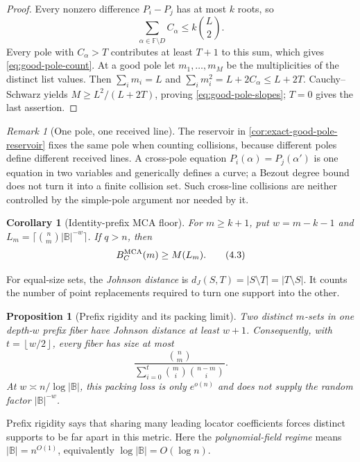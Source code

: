 \documentclass[11pt,a4paper]{amsart}
\numberwithin{equation}{section}
\newtheorem{proposition}[proposition]{Proposition}
\newtheorem{corollary}[corollary]{Corollary}
\theoremstyle{remark}
\newtheorem{remark}[remark]{Remark}
\newcommand{\F}{\mathbb F}
\newcommand{\B}{\mathbb B}
\newcommand{\abs}[1]{\lvert #1\rvert}
\newcommand{\floor}[1]{\left\lfloor #1\right\rfloor}
\begin{document}
\begin{proof}
Every nonzero difference \(P_i-P_j\) has at most \(k\) roots, so
\[
                 \sum_{\alpha\in\F\setminus D}C_\alpha
                    \le k\binom L2.
\]
Every pole with \(C_\alpha>T\) contributes at least \(T+1\) to this
sum, which gives \eqref{eq:good-pole-count}.  At a good
pole let \(m_1,\ldots,m_M\) be the multiplicities of the distinct list
values.  Then
\(\sum_im_i=L\) and
\(\sum_im_i^2=L+2C_\alpha\le L+2T\).  Cauchy--Schwarz yields
\(M\ge L^2/(L+2T)\), proving \eqref{eq:good-pole-slopes}; \(T=0\)
gives the last assertion.
\end{proof}

\begin{remark}[One pole, one received line]
The reservoir in \cref{cor:exact-good-pole-reservoir} fixes the same pole
when counting collisions, because different poles define different
received lines.  A cross-pole equation
\(P_i(\alpha)=P_j(\alpha')\) is one equation in two variables and
generically defines a curve; a Bezout degree bound does not turn it into a
finite collision set.  Such cross-line collisions are neither controlled
by the simple-pole argument nor needed by it.
\end{remark}

\begin{corollary}[Identity-prefix MCA floor]\label{cor:identity-prefix-floor}
For \(m\ge k+1\), put \(w=m-k-1\) and
\(L_m=\lceil\binom nm\abs\B^{-w}\rceil\).  If \(q>n\), then
\[
 B_C^{\rm MCA}(m)\ge M(L_m).
 \tag{4.3}\label{eq:identity-prefix-floor}
\]
\end{corollary}

For equal-size sets, the \emph{Johnson distance} is
\(d_J(S,T)=\abs{S\setminus T}=\abs{T\setminus S}\).  It counts the
number of point replacements required to turn one support into the other.

\begin{proposition}[Prefix rigidity and its packing limit]
\label{prop:prefix-rigidity-full}
Two distinct \(m\)-sets in one depth-\(w\) prefix fiber have Johnson
distance at least \(w+1\).  Consequently, with
\(t=\floor{w/2}\), every fiber has size at most
\[
 \frac{\binom nm}{\sum_{i=0}^t\binom mi\binom{n-m}{i}}.
 \tag{4.4}\label{eq:packing-fiber-cap}
\]
At \(w\asymp n/\log\abs\B\), this packing loss is only
\(e^{o(n)}\) and does not supply the random factor \(\abs\B^{-w}\).
\end{proposition}

Prefix rigidity says that sharing many leading locator coefficients forces
distinct supports to be far apart in this metric.  Here the
\emph{polynomial-field regime} means \(\abs\B=n^{O(1)}\), equivalently
\(\log\abs\B=O(\log n)\).
\end{document}

